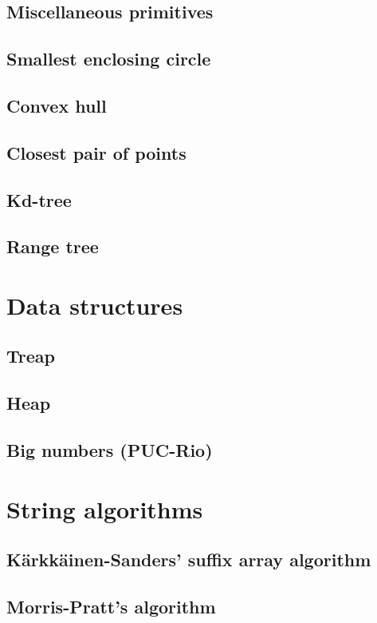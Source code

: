 \documentclass[a4paper]{amsart}
\begin{document}
    \subsection{Miscellaneous primitives}
    \subsection{Smallest enclosing circle}
    \subsection{Convex hull}
    \subsection{Closest pair of points}
    \subsection{Kd-tree}
    \subsection{Range tree}

  \section{Data structures}
    \subsection{Treap}
    \subsection{Heap}
    \subsection{Big numbers (PUC-Rio)}

  \section{String algorithms}
    \subsection{Kärkkäinen-Sanders' suffix array algorithm}
    \subsection{Morris-Pratt's algorithm}
\end{document}
